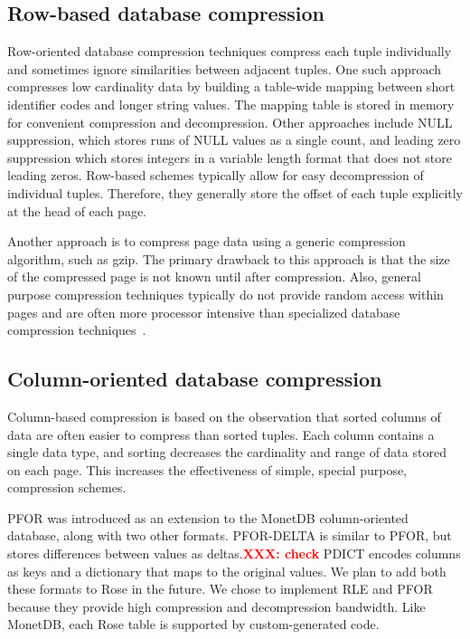 \documentclass{vldb}
\newcommand{\rows}{Rose\xspace}
\newcommand{\xxx}[1]{\textcolor{red}{\bf XXX: #1}}
\begin{document}
\subsection{Row-based database compression}

Row-oriented database compression techniques compress each tuple
individually and sometimes ignore similarities between adjacent
tuples.  One such approach compresses low cardinality data by building a
table-wide mapping between short identifier codes and longer string
values. The mapping table is stored in memory for convenient
compression and decompression.  Other approaches include NULL
suppression, which stores runs of NULL values as a single count, and
leading zero suppression which stores integers in a variable length
format that does not store leading zeros.  Row-based schemes typically
allow for easy decompression of individual tuples.  Therefore, they
generally store the offset of each tuple explicitly at the head of
each page.

Another approach is to compress page data using a generic compression
algorithm, such as gzip.  The primary drawback to this approach is
that the size of the compressed page is not known until after
compression.  Also, general purpose compression techniques typically
do not provide random access within pages and are often more processor
intensive than specialized database compression
techniques~\cite{rowImplementationPerf}.

\subsection{Column-oriented database compression}

Column-based compression is based on the observation that sorted
columns of data are often easier to compress than sorted tuples.  Each
column contains a single data type, and sorting decreases the
cardinality and range of data stored on each page.  This increases the
effectiveness of simple, special purpose, compression schemes.

PFOR was introduced as an extension to
the MonetDB\cite{pfor} column-oriented database, along with two other
formats.  PFOR-DELTA is similar to PFOR, but stores differences between values as
deltas.\xxx{check}  PDICT encodes columns as keys and a dictionary that
maps to the original values.  We plan to add both these formats to
\rows in the future.  We chose to implement RLE and PFOR because they
provide high compression and decompression bandwidth.  Like MonetDB,
each \rows table is supported by custom-generated code.
\end{document}
